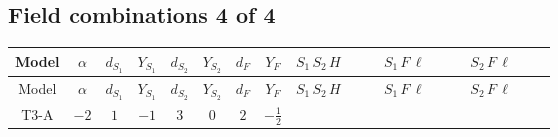 \documentclass[8pt]{article}
\begin{document}
\begin{landscape}
\subsection*{Field combinations 4 of 4}
\begin{longtable}{@{}cccccccc >{\raggedright\arraybackslash}p{0.21\linewidth} >{\raggedright\arraybackslash}p{0.21\linewidth} >{\raggedright\arraybackslash}p{0.21\linewidth}@{}}
\toprule
Model & $\alpha$ & $d_{S_1}$ & $Y_{S_1}$ & $d_{S_2}$ & $Y_{S_2}$ & $d_F$ & $Y_F$ & $S_1\,S_2\,H$ & $S_1\,F\,\ell$ & $S_2\,F\,\ell$ \\
\midrule
\endfirsthead
\toprule
Model & $\alpha$ & $d_{S_1}$ & $Y_{S_1}$ & $d_{S_2}$ & $Y_{S_2}$ & $d_F$ & $Y_F$ & $S_1\,S_2\,H$ & $S_1\,F\,\ell$ & $S_2\,F\,\ell$ \\
\midrule
\endhead
T3-A & $-2$ & $1$ & $-1$ & $3$ & $0$ & $2$ & $-\frac{1}{2}$ & \scriptsize\adjustbox{max width=\linewidth}{$\begin{gathered} +\overline{\lambda_{T3}} S_{2,j_1} {\mathcal{I}_{T3}}^{*}_{a_1,a_2,j_1} H_{a_1}{}^{\dagger } H_{a_2}{}^{\dagger } S_1{}^{\dagger } \\ +H_{a_1} H_{a_2} S_1 \mathcal{I}_{T3,a_1,a_2,j_1} \lambda_{T3} S_{2,j_1}{}^{\dagger }\end{gathered}$} & \scriptsize\adjustbox{max width=\linewidth}{$\begin{gathered} +\overline{L_{a_1,i_1}}\, C\, P_R\, \overline{F_{j_1,r_1}}{}^T S_1 y_{1,i_1,r_1} \mathcal{I}_{y_1,a_1,j_1} \\ +\overline{y_{1,i_1,r_1}} L_{a_1,i_1}{}^T\, C\, P_L\, F_{j_1,r_1} {\mathcal{I}_{y_1}}^{*}_{a_1,j_1} S_1{}^{\dagger }\end{gathered}$} & \scriptsize\adjustbox{max width=\linewidth}{$\begin{gathered} +\overline{y_{2,i_1,r_1}} \overline{F_{j_1,r_1}}\, P_L\, L_{a_1,i_1} S_{2,j_1} {\mathcal{I}_{y_2}}^{*}_{a_1,j_1,j_1} \\ +\overline{L_{a_1,i_1}}\, P_R\, F_{j_1,r_1} y_{2,i_1,r_1} \mathcal{I}_{y_2,a_1,j_1,j_1} S_{2,j_1}{}^{\dagger }\end{gathered}$} \\
\midrule

\end{longtable}
\end{landscape}
\end{document}
